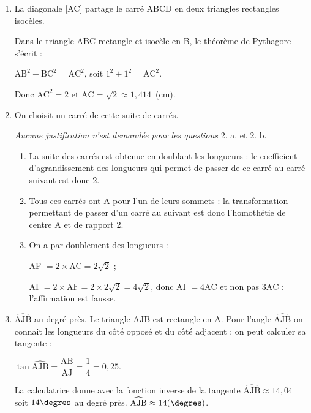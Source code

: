 \begin{enumerate}
\item %
La diagonale [AC] partage le carré ABCD en deux triangles rectangles isocèles.

Dans le triangle ABC rectangle et isocèle en B, le théorème de Pythagore s'écrit :

$\text{AB}^2 + \text{BC}^2 = \text{AC}^2$, soit $1^2 + 1^2 = \text{AC}^2$.

Donc $\text{AC}^2 = 2$ et $\text{AC} = \sqrt{2} \approx 1,414$~(cm).
\item On choisit un carré de cette suite de carrés. 

\emph{Aucune justification n'est demandée pour les questions} 2. a. et 2. b.
	\begin{enumerate}
		\item %
La suite des carrés est obtenue en doublant les longueurs  : le coefficient d'agrandissement des longueurs qui permet de passer de ce carré au carré suivant est donc 2.
		\item %
Tous ces carrés ont A pour l'un de leurs sommets : la transformation permettant de passer d'un carré au suivant est donc l'homothétie de centre A et de rapport 2.
		

\item 
On a par doublement des longueurs :

AF $=  2 \times \text{AC} = 2\sqrt{2}$ ;

AI $= 2 \times \text{AF}  = 2 \times 2\sqrt{2} = 4\sqrt{2}$, donc AI $ = 4\text{AC}$ et non pas $3\text{AC}$ : l'affirmation est fausse.
	\end{enumerate}
\item %
$\widehat{\text{AJB}}$ au degré près.
Le triangle AJB est rectangle en A. Pour l'angle $\widehat{\text{AJB}}$ on connait les longueurs du côté opposé et du côté adjacent ; on peut calculer sa tangente :

$\tan \widehat{\text{AJB}} = \dfrac{\text{AB}}{\text{AJ}} = \dfrac{1}{4} = 0,25$.

La calculatrice donne avec la fonction inverse de la tangente $\widehat{\text{AJB}} \approx 14,04$ soit $14\degres$ au degré près. $\widehat{\text{AJB}} \approx 14(\degres)$.
\end{enumerate}
\bigskip

